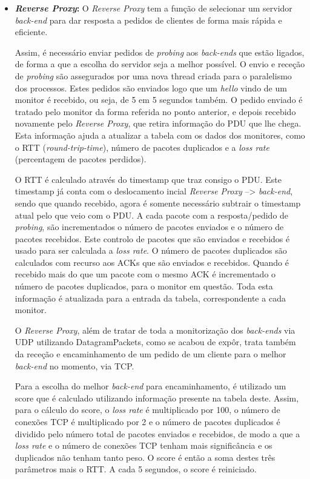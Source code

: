 \documentclass{llncs}
\begin{document}
\begin{itemize}
	\item \textbf{\textit{Reverse Proxy}:} O \textit{Reverse Proxy} tem a função de selecionar um servidor \textit{back-end} para dar resposta a pedidos de clientes de forma mais rápida e eficiente.\par 
	Assim, é necessário enviar pedidos de \textit{probing} aos \textit{back-ends} que estão ligados, de forma a que a escolha do servidor seja a melhor possível. O envio e receção de \textit{probing} são assegurados por uma nova thread criada para o paralelismo dos processos. Estes pedidos são enviados logo que um \textit{hello} vindo de um monitor é recebido, ou seja, de 5 em 5 segundos também. O pedido enviado é tratado pelo monitor da forma referida no ponto anterior, e depois recebido novamente pelo \textit{Reverse Proxy}, que retira informação do PDU que lhe chega. Esta informação ajuda a atualizar a tabela com os dados dos monitores, como o RTT (\textit{round-trip-time}), número de pacotes duplicados e a \textit{loss rate} (percentagem de pacotes perdidos).\par 
	O RTT é calculado através do timestamp que traz consigo o PDU. Este timestamp já conta com o deslocamento incial \textit{Reverse Proxy} --> \textit{back-end}, sendo que quando recebido, agora é somente necessário subtrair o timestamp atual pelo que veio com o PDU. A cada pacote com a resposta/pedido de \textit{probing}, são incrementados o número de pacotes enviados e o número de pacotes recebidos. Este controlo de pacotes que são enviados e recebidos é usado para ser calculada a \textit{loss rate}. O número de pacotes duplicados são calculados com recurso aos ACKs que são enviados e recebidos. Quando é recebido mais do que um pacote com o mesmo ACK é incrementado o número de pacotes duplicados, para o monitor em questão. Toda esta informação é atualizada para a entrada da tabela, correspondente a cada monitor.\par
	O \textit{Reverse Proxy}, além de tratar de toda a monitorização dos \textit{back-ends} via UDP utilizando DatagramPackets, como se acabou de expôr, trata também da receção e encaminhamento de um pedido de um cliente para o melhor \textit{back-end} no momento, via TCP.\par
	Para a escolha do melhor \textit{back-end} para encaminhamento, é utilizado um score que é calculado utilizando informação presente na tabela deste. Assim, para o cálculo do score, o \textit{loss rate} é multiplicado por 100, o número de conexões TCP é multiplicado por 2 e o número de pacotes duplicados é dividido pelo número total de pacotes enviados e recebidos, de modo a que a \textit{loss rate} e o número de conexões TCP tenham mais significância e os duplicados não tenham tanto peso. O score é então a soma destes três parâmetros mais o RTT. A cada 5 segundos, o score é reiniciado.\par

\end{itemize}
\end{document}
